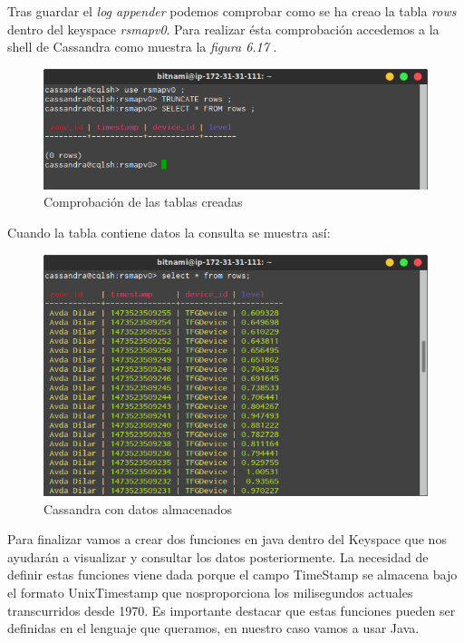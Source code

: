 \bigskip

Tras guardar el \textit{log appender} podemos comprobar como se ha creao la tabla \textit{rows} dentro del keyspace \textit{rsmapv0}. Para realizar ésta comprobación accedemos a la shell de Cassandra como muestra la \textit{figura 6.17	}.

\begin{figure}[!ht]
  \begin{center}
    \includegraphics[scale=0.65]{../images/cassandra/4.png}
		\caption{Comprobación de las tablas creadas}
    \label{fig:kaa}
	\end{center}
\end{figure}

\newpage

Cuando la tabla contiene datos la consulta se muestra así:

\begin{figure}[!ht]
  \begin{center}
    \includegraphics[scale=0.65]{../images/cassandra/6.png}
		\caption{Cassandra con datos almacenados}
    \label{fig:kaa}
	\end{center}
\end{figure}

Para finalizar vamos a crear dos funciones en java dentro del Keyspace que nos ayudarán a visualizar y consultar los datos posteriormente. La necesidad de definir estas funciones viene dada porque el campo TimeStamp se almacena bajo el formato UnixTimestamp que nosproporciona los milisegundos actuales transcurridos desde 1970. Es importante destacar que estas funciones pueden ser definidas en el lenguaje que queramos, en nuestro caso vamos a usar Java.


